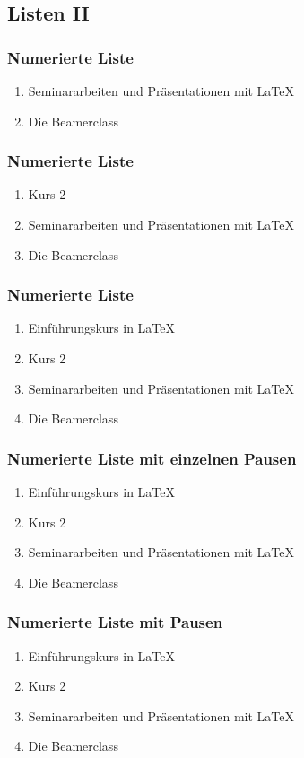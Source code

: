 \documentclass[hyperref={pdfpagelabels=false}]{beamer}
\begin{document}
\subsection{Listen II}
\begin{frame}
\frametitle{Numerierte Liste}
\begin{enumerate}
\item  Seminararbeiten und Pr\"asentationen mit \LaTeX{} 
\item  Die Beamerclass
\end{enumerate}
\end{frame}

\begin{frame}
\frametitle{Numerierte Liste}
\begin{enumerate}
\item  Kurs 2
\item  Seminararbeiten und Pr\"asentationen mit \LaTeX{} 
\item  Die Beamerclass
\end{enumerate}
\end{frame}

\begin{frame}
\frametitle{Numerierte Liste}
\begin{enumerate}
\item  Einf\"uhrungskurs in \LaTeX{} 
\item  Kurs 2
\item  Seminararbeiten und Pr\"asentationen mit \LaTeX{} 
\item  Die Beamerclass
\end{enumerate}
\end{frame}

\begin{frame}
\frametitle{Numerierte Liste mit einzelnen Pausen}
\begin{enumerate}
\item  Einf\"uhrungskurs in \LaTeX{} \pause 
\item  Kurs 2 \pause 
\item  Seminararbeiten und Pr\"asentationen mit \LaTeX{} \pause 
\item  Die Beamerclass
\end{enumerate}
\end{frame}

\begin{frame}
\frametitle{Numerierte Liste mit  Pausen}
\begin{enumerate}[<+->]
\item  Einf\"uhrungskurs in \LaTeX{} 
\item  Kurs 2 
\item  Seminararbeiten und Pr\"asentationen mit \LaTeX{} 
\item  Die Beamerclass
\end{enumerate}
\end{frame}
\end{document}
